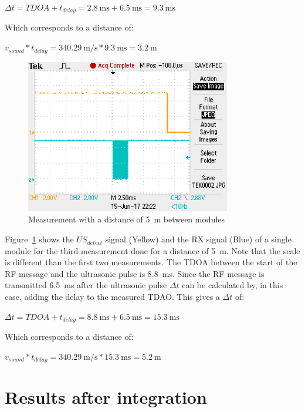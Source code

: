 $ \Delta t = TDOA + t_{delay}  = \SI{2.8}{\milli\second} + \SI{6.5}{\milli\second} = \SI{9.3}{\milli\second} $

Which corresponds to a distance of:

$ v_{sound} * t_{delay} = \SI{340.29}{\meter\per\second} * \SI{9.3}{\milli\second} = \SI{3.2}{\meter} $

\begin{figure}[H]
\centering
\includegraphics[width=0.8\textwidth]{Figures/test_5m.JPG}
\caption{Measurement with a distance of \SI{5}{\meter} between modules}
\label{fig:mes_5}
\end{figure}

Figure~\ref{fig:mes_5} shows the $US_{detect}$ signal (Yellow) and the RX signal (Blue) of a single module for the third measurement done for a distance of \SI{5}{\meter}.
Note that the scale is different than the first two measurements.
The TDOA between the start of the RF message and the ultrasonic pulse is \SI{8.8}{\milli\second}.
Since the RF message is transmitted \SI{6.5}{\milli\second} after the ultrasonic pulse $\Delta t$ can be calculated by, in this case, adding the delay to the measured TDAO.
This gives a $\Delta t$ of:

$ \Delta t = TDOA + t_{delay}  = \SI{8.8}{\milli\second} + \SI{6.5}{\milli\second} = \SI{15.3}{\milli\second} $

Which corresponds to a distance of:

$ v_{sound} * t_{delay} = \SI{340.29}{\meter\per\second} * \SI{15.3}{\milli\second} = \SI{5.2}{\meter} $

\section{Results after integration}


